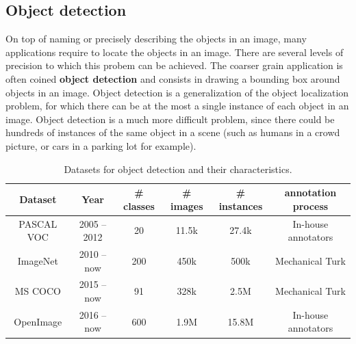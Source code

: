\subsection{Object detection}

On top of naming or precisely describing the objects in an image, many applications require to locate the objects in an image. There are several levels of precision to which this probem can be achieved. The coarser grain application is often coined \textbf{object detection} and consists in drawing a bounding box around objects in an image. Object detection is a generalization of the object localization problem, for which there can be at the most a single instance of each object in an image. Object detection is a much more difficult problem, since there could be hundreds of instances of the same object in a scene (such as humans in a crowd picture, or cars in a parking lot for example).

\vspace{0.5cm}

\begin{table}
	\centering
	\caption{Datasets for object detection and their characteristics.}
	\begin{tabular}{|c|c|c|c|c|c|}
		\hline
		Dataset & Year & \# classes & \# images & \# instances & annotation process \\
		\hline
		PASCAL VOC \cite{Everingham10} & 2005 -- 2012 & 20 & 11.5k & 27.4k & In-house annotators \\
		ImageNet\cite{ILSVRC15} & 2010 -- now & 200 & 450k & 500k & Mechanical Turk \\
		MS COCO \cite{chen2015microsoft} & 2015 -- now & 91 & 328k & 2.5M & Mechanical Turk \\
		OpenImage \cite{OpenImages, OpenImages2} & 2016 -- now & 600 & 1.9M & 15.8M & In-house annotators \\
		\hline
	\end{tabular}
	\label{tab:detection_ds}
\end{table}
\vspace{0.5cm}

